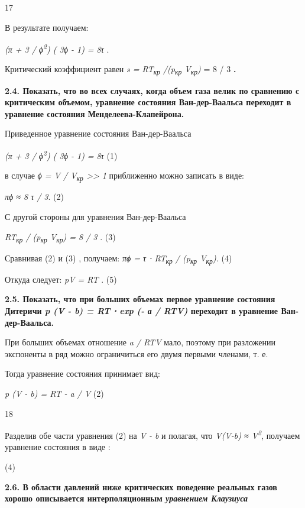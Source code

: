 17

В результате получаем:

\emph{(π + 3 / ϕ\textsuperscript{2}) ( 3ϕ - 1) = 8τ} .

Критический коэффициент равен \emph{s = RT\textsubscript{кр}
/(p\textsubscript{кр} V\textsubscript{кр})} = 8 / 3 \textbf{.}

\textbf{2.4. Показать, что во всех случаях, когда объем газа велик по
сравнению с критическим объемом, уравнение состояния Ван-дер-Ваальса
переходит в уравнение состояния Менделеева-Клапейрона.}

\solving{}

Приведенное уравнение состояния Ван-дер-Ваальса

\emph{(π + 3 / ϕ\textsuperscript{2}) ( 3ϕ - 1) = 8τ} (1)

в случае \emph{ϕ = V / V\textsubscript{кр} \textgreater\textgreater{} 1}
приближенно можно записать в виде:

\emph{πϕ ≈ 8 τ / 3}. (2)

С другой стороны для уравнения Ван-дер-Ваальса

\emph{RT\textsubscript{кр} / (p\textsubscript{кр} V\textsubscript{кр}) =
8 / 3} . (3)

Сравнивая (2) и (3) , получаем: \emph{πϕ = τ ⋅ RT\textsubscript{кр} /
(p\textsubscript{кр} V\textsubscript{кр}).} (4)

Откуда следует: \emph{pV = RT} . (5)

\textbf{2.5. Показать, что при больших объемах первое уравнение
состояния Дитеричи \emph{p (V - b) = RT ⋅ exp (- а / RTV)} переходит в
уравнение Ван-дер-Ваальса.}

\solving{}

При больших объемах отношение \emph{a / RTV} мало, поэтому при
разложении экспоненты в ряд можно ограничиться его двумя первыми
членами, т. е.


Тогда уравнение состояния принимает вид:

\emph{p (V - b) = RT - a / V} (2)

18

Разделив обе части уравнения (2) на \emph{V - b} и полагая, что
\emph{V(V-b) ≈ V\textsuperscript{2}}, получаем уравнение состояния в
виде :

(4)

\textbf{2.6. В области давлений ниже критических поведение реальных
газов хорошо описывается интерполяционным \emph{уравнением Клаузиуса}}

